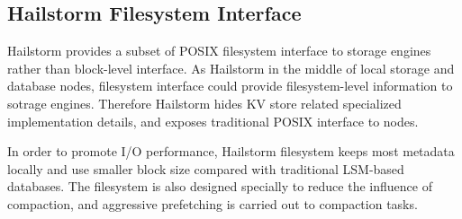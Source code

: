 \documentclass[a4paper,10pt,twoside]{article}
\begin{document}
\subsection{Hailstorm Filesystem Interface}
\par
Hailstorm provides a subset of POSIX filesystem interface to storage engines rather than block-level interface.
As Hailstorm in the middle of local storage and database nodes, filesystem interface could provide filesystem-level information to sotrage engines.
Therefore Hailstorm hides KV store related specialized implementation details, and exposes traditional POSIX interface to nodes.
\par
In order to promote I/O performance, Hailstorm filesystem keeps most metadata locally and use smaller block size compared with traditional LSM-based databases.
The filesystem is also designed specially to reduce the influence of compaction, and aggressive prefetching is carried out to compaction tasks.
\end{document}
